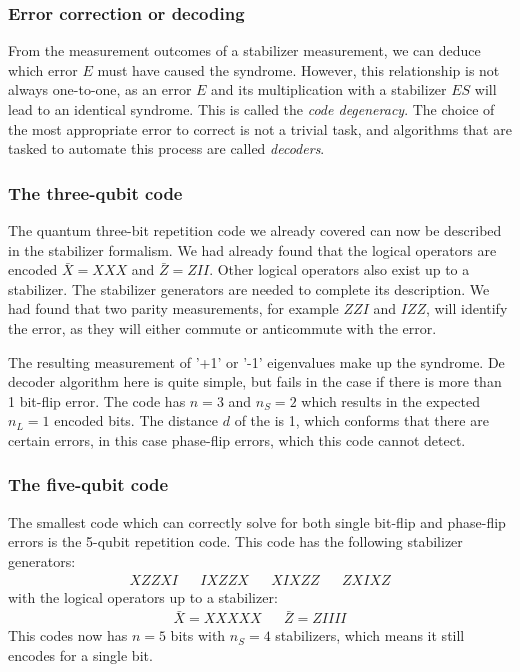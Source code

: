 \subsubsection{Error correction or decoding}

From the measurement outcomes of a stabilizer measurement, we can deduce which error $E$ must have caused the syndrome. However, this relationship is not always one-to-one, as an error $E$ and its multiplication with a stabilizer $ES$ will lead to an identical syndrome. This is called the \emph{code degeneracy}. The choice of the most appropriate error to correct is not a trivial task, and algorithms that are tasked to automate this process are called \emph{decoders}. 


\subsubsection{The three-qubit code}

The quantum three-bit repetition code we already covered can now be described in the stabilizer formalism. We had already found that the logical operators are encoded $\bar{X} = XXX$ and $\bar{Z} = ZII$. Other logical operators also exist up to a stabilizer. The stabilizer generators are needed to complete its description. We had found that two parity measurements, for example $ZZI$ and $IZZ$, will identify the error, as they will either commute or anticommute with the error. 

The resulting measurement of '+1' or '-1' eigenvalues make up the syndrome. De decoder algorithm here is quite simple, but fails in the case if there is more than 1 bit-flip error. The code has $n=3$ and $n_S=2$ which results in the expected $n_L = 1$ encoded bits. The distance $d$ of the is 1, which conforms that there are certain errors, in this case phase-flip errors, which this code cannot detect.

\subsubsection{The five-qubit code}
The smallest code which can correctly solve for both single bit-flip and phase-flip errors is the 5-qubit repetition code. This code has the following stabilizer generators:
\begin{align}
  XZZXI && IXZZX && XIXZZ && ZXIXZ
\end{align}
with the logical operators up to a stabilizer:
\begin{align}
  & \bar{X} = XXXXX && \bar{Z} = ZIIII &
\end{align}
This codes now has $n=5$ bits with $n_S = 4$ stabilizers, which means it still encodes for a single bit. 


